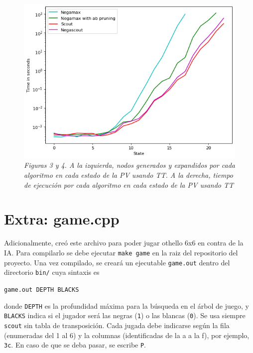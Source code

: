 \documentclass[a4paper,10pt]{article}
\begin{document}
\begin{figure}[t!]
  \includegraphics[scale=0.5]{figura6.png}
  \\
  \small{\textit{Figuras 3 y 4. A la izquierda, nodos generados y expandidos por cada 
  algoritmo en cada estado de la PV usando TT. A la derecha, tiempo de ejecuci\'on por 
  cada algoritmo en cada estado de la PV usando TT}}
\end{figure}


\section*{Extra: game.cpp}
  Adicionalmente, cre\'o este archivo para poder jugar othello 6x6 en contra de la IA. Para 
  compilarlo se debe ejecutar \verb|make game| en la raiz del repositorio del proyecto. Una vez 
  compilado, se crear\'a un ejecutable \verb|game.out| dentro del directorio \verb|bin/| cuya 
  sintaxis es 

  \begin{center}
    \verb|game.out DEPTH BLACKS|
  \end{center}

  \noindent
  donde \verb|DEPTH| es la profundidad m\'axima para la b\'usqueda en el \'arbol de juego, y 
  \verb|BLACKS| indica si el jugador ser\'a las negras (\verb|1|) o las blancas (\verb|0|). Se 
  usa siempre \verb|scout| sin tabla de transposici\'on. Cada jugada debe indicarse 
  seg\'un la fila (enumeradas del 1 al 6) y la columnas (identificadas de la a a la f), por ejemplo, 
  \verb|3c|. En caso de que se deba pasar, se escribe \verb|P|.
\end{document}

